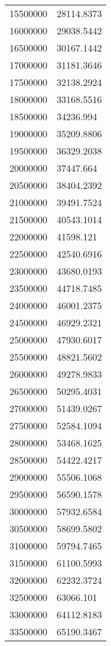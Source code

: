 \documentclass{article}
\begin{document}
\begin{longtable}[c]{ll}
15500000       & 28114.8373  \\
16000000       & 29038.5442  \\
16500000       & 30167.1442  \\
17000000       & 31181.3646  \\
17500000       & 32138.2924  \\
18000000       & 33168.5516  \\
18500000       & 34236.994   \\
19000000       & 35209.8806  \\
19500000       & 36329.2038  \\
20000000       & 37447.664   \\
20500000       & 38404.2392  \\
21000000       & 39491.7524  \\
21500000       & 40543.1014  \\
22000000       & 41598.121   \\
22500000       & 42540.6916  \\
23000000       & 43680.0193  \\
23500000       & 44718.7485  \\
24000000       & 46001.2375  \\
24500000       & 46929.2321  \\
25000000       & 47930.6017  \\
25500000       & 48821.5602  \\
26000000       & 49278.9833  \\
26500000       & 50295.4031  \\
27000000       & 51439.0267  \\
27500000       & 52584.1094  \\
28000000       & 53468.1625  \\
28500000       & 54422.4217  \\
29000000       & 55506.1068  \\
29500000       & 56590.1578  \\
30000000       & 57932.6584  \\
30500000       & 58699.5802  \\
31000000       & 59794.7465  \\
31500000       & 61100.5993  \\
32000000       & 62232.3724  \\
32500000       & 63066.101   \\
33000000       & 64112.8183  \\
33500000       & 65190.3467  \\

\end{longtable}
\end{document}
